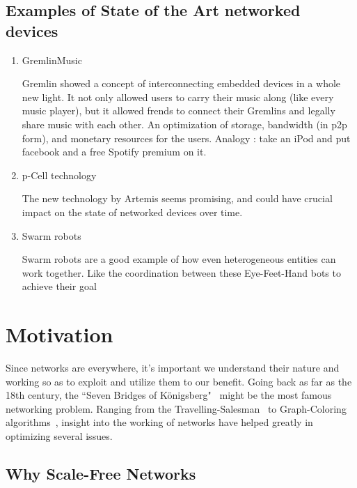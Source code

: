 \subsection{Examples of State of the Art networked devices }
\begin{enumerate}

\item GremlinMusic ~\cite{gremlin}

Gremlin showed a concept of interconnecting embedded devices in a whole new light. It not only allowed users to carry their music along (like every music player), but it allowed frends to connect their Gremlins and legally share music with each other. An optimization of storage, bandwidth (in p2p form), and monetary resources for the users.  Analogy : take an iPod and put facebook and a free Spotify premium on it.

\item p-Cell technology ~\cite{pCell}

The new technology by Artemis seems promising, and could have crucial impact on the state of networked devices over time.


\item Swarm robots ~\cite{swarm..robots}

Swarm robots are a good example of how even heterogeneous entities can work together. Like the coordination between these Eye-Feet-Hand bots to achieve their goal

\end{enumerate}




\section{Motivation}

Since networks are everywhere, it's important we understand their nature and working so as to exploit and utilize them to our benefit.  
Going back as far as the 18th century, the ``Seven Bridges of Königsberg"~\cite{konigsberg} might be the most famous networking problem. Ranging from the Travelling-Salesman~\cite{traveling} to Graph-Coloring algorithms~\cite{graph}, insight into the working of networks have helped greatly in optimizing several issues.

\subsection{Why Scale-Free Networks}

